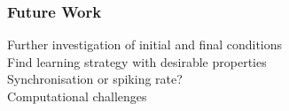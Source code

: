 \begin{frame}
\frametitle{Future Work}
\tabitem Further investigation of initial and final conditions \\
\tabitem Find learning strategy with desirable properties \\
\tabitem Synchronisation or spiking rate? \\
\tabitem Computational challenges
\end{frame}

